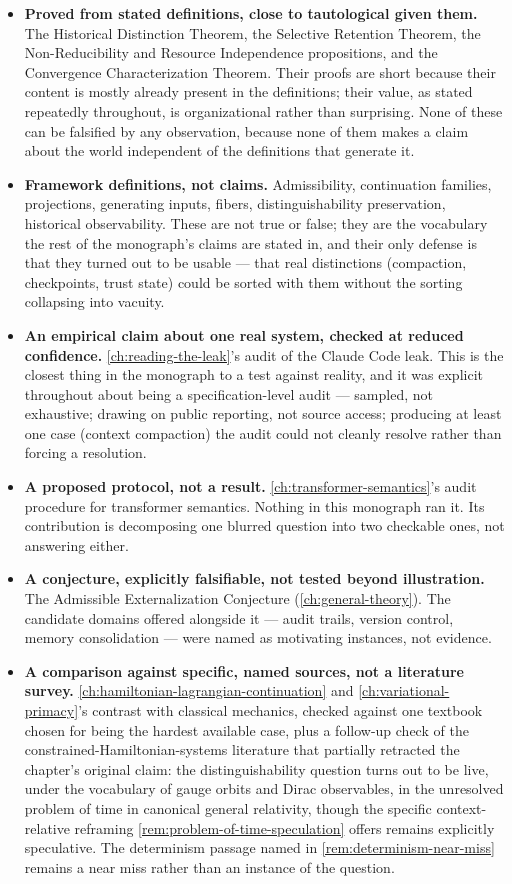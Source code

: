 \documentclass[11pt]{book}
\theoremstyle{plain}
\theoremstyle{definition}
\theoremstyle{remark}
\begin{document}
\begin{itemize}
\item \textbf{Proved from stated definitions, close to tautological
given them.} The Historical Distinction Theorem, the Selective
Retention Theorem, the Non-Reducibility and Resource Independence
propositions, and the Convergence Characterization Theorem. Their
proofs are short because their content is mostly already present in
the definitions; their value, as stated repeatedly throughout, is
organizational rather than surprising. None of these can be falsified
by any observation, because none of them makes a claim about the
world independent of the definitions that generate it.
\item \textbf{Framework definitions, not claims.} Admissibility,
continuation families, projections, generating inputs, fibers,
distinguishability preservation, historical observability. These are
not true or false; they are the vocabulary the rest of the monograph's
claims are stated in, and their only defense is that they turned out
to be usable --- that real distinctions (compaction, checkpoints, trust
state) could be sorted with them without the sorting collapsing into
vacuity.
\item \textbf{An empirical claim about one real system, checked at
reduced confidence.} \cref{ch:reading-the-leak}'s audit of the Claude
Code leak. This is the closest thing in the monograph to a test
against reality, and it was explicit throughout about being a
specification-level audit --- sampled, not exhaustive; drawing on
public reporting, not source access; producing at least one case
(context compaction) the audit could not cleanly resolve rather than
forcing a resolution.
\item \textbf{A proposed protocol, not a result.} \cref{ch:transformer-semantics}'s
audit procedure for transformer semantics. Nothing in this monograph
ran it. Its contribution is decomposing one blurred question into two
checkable ones, not answering either.
\item \textbf{A conjecture, explicitly falsifiable, not tested beyond
illustration.} The Admissible Externalization Conjecture
(\cref{ch:general-theory}). The candidate domains offered alongside it
--- audit trails, version control, memory consolidation --- were named
as motivating instances, not evidence.
\item \textbf{A comparison against specific, named sources, not a
literature survey.} \cref{ch:hamiltonian-lagrangian-continuation} and
\cref{ch:variational-primacy}'s contrast with classical mechanics,
checked against one textbook chosen for being the hardest available
case, plus a follow-up check of the constrained-Hamiltonian-systems
literature that partially retracted the chapter's original claim: the
distinguishability question turns out to be live, under the vocabulary
of gauge orbits and Dirac observables, in the unresolved problem of
time in canonical general relativity, though the specific
context-relative reframing \cref{rem:problem-of-time-speculation}
offers remains explicitly speculative. The determinism passage named
in \cref{rem:determinism-near-miss} remains a near miss rather than an
instance of the question.
\end{itemize}
\end{document}
